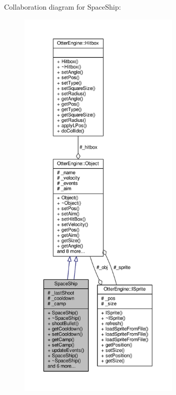 Collaboration diagram for Space\+Ship\+:\nopagebreak
\begin{figure}[H]
\begin{center}
\leavevmode
\includegraphics[height=550pt]{d4/da1/class_space_ship__coll__graph}
\end{center}
\end{figure}
